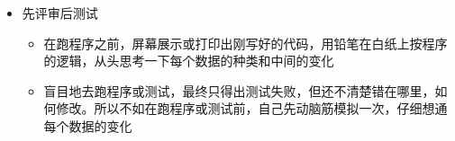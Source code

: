 {\begin{minipage}[t]{0.97\columnwidth}
\begin{itemize}
\tightlist
\item
  先评审后测试

  \begin{itemize}
  \tightlist
  \item
    在跑程序之前，屏幕展示或打印出刚写好的代码，用铅笔在白纸上按程序的逻辑，从头思考一下每个数据的种类和中间的变化
  \item
    盲目地去跑程序或测试，最终只得出测试失败，但还不清楚错在哪里，如何修改。所以不如在跑程序或测试前，自己先动脑筋模拟一次，仔细想通每个数据的变化
  \end{itemize}
\end{itemize}\strut
\end{minipage}}





